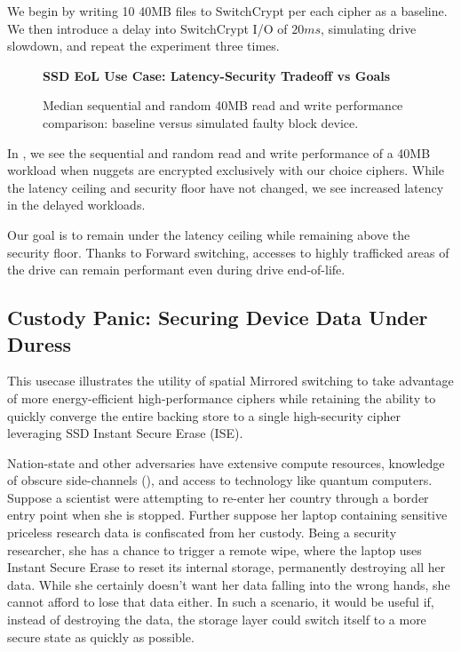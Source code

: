 We begin by writing 10 40MB files to SwitchCrypt per each cipher as a baseline.
We then introduce a delay into SwitchCrypt I/O of $20ms$, simulating drive
slowdown, and repeat the experiment three times.

\begin{figure}[ht] \textbf{SSD EoL Use Case: Latency-Security Tradeoff vs
   Goals}\par\medskip
   {} \caption{Median sequential and
   random 40MB read and write performance comparison: baseline versus simulated
   faulty block device.}
  \label{fig:usecase-eol-tradeoff}
\end{figure}

In , we see the sequential and random read and
write performance of a 40MB workload when nuggets are encrypted exclusively with
our choice ciphers. While the latency ceiling and security floor have not
changed, we see increased latency in the delayed workloads.

Our goal is to remain under the latency ceiling while remaining above the
security floor. Thanks to Forward switching, accesses to highly trafficked areas
of the drive can remain performant even during drive end-of-life.

\subsection{Custody Panic: Securing Device Data Under Duress}\label{subsec:uc4}

This usecase illustrates the utility of spatial Mirrored switching to take
advantage of more energy-efficient high-performance ciphers while retaining the
ability to quickly converge the entire backing store to a single high-security
cipher leveraging SSD Instant Secure Erase (ISE).

Nation-state and other adversaries have extensive compute resources, knowledge
of obscure side-channels (), and access to technology like
quantum computers. Suppose a scientist were attempting to re-enter her country
through a border entry point when she is stopped. Further suppose her laptop
containing sensitive priceless research data is confiscated from her custody.
Being a security researcher, she has a chance to trigger a remote wipe, where
the laptop uses Instant Secure Erase to reset its internal storage, permanently
destroying all her data. While she certainly doesn't want her data falling into
the wrong hands, she cannot afford to lose that data either. In such a scenario,
it would be useful if, instead of destroying the data, the storage layer could
switch itself to a more secure state as quickly as possible.

